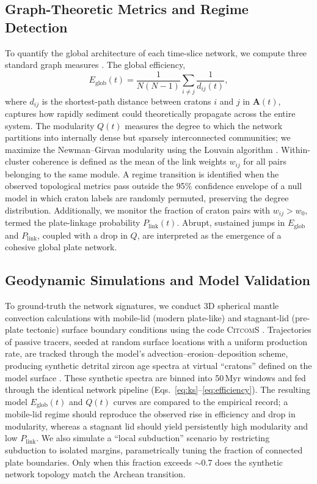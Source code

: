 \documentclass{article}
\begin{document}
\subsection{Graph-Theoretic Metrics and Regime Detection}
To quantify the global architecture of each time-slice network, we compute three standard graph measures \cite{newman2018networks}. The global efficiency,
\begin{equation}
E_{\text{glob}}(t) = \frac{1}{N(N-1)} \sum_{i \neq j} \frac{1}{d_{ij}(t)},
\label{eq:efficiency}
\end{equation}
where $d_{ij}$ is the shortest-path distance between cratons $i$ and $j$ in $\mathbf{A}(t)$, captures how rapidly sediment could theoretically propagate across the entire system. The modularity $Q(t)$ measures the degree to which the network partitions into internally dense but sparsely interconnected communities; we maximize the Newman–Girvan modularity using the Louvain algorithm \cite{blondel2008louvain}. Within-cluster coherence is defined as the mean of the link weights $w_{ij}$ for all pairs belonging to the same module. A regime transition is identified when the observed topological metrics pass outside the 95\% confidence envelope of a null model in which craton labels are randomly permuted, preserving the degree distribution. Additionally, we monitor the fraction of craton pairs with $w_{ij} > w_0$, termed the plate-linkage probability $P_{\text{link}}(t)$. Abrupt, sustained jumps in $E_{\text{glob}}$ and $P_{\text{link}}$, coupled with a drop in $Q$, are interpreted as the emergence of a cohesive global plate network.

\subsection{Geodynamic Simulations and Model Validation}
To ground-truth the network signatures, we conduct 3D spherical mantle convection calculations with mobile-lid (modern plate-like) and stagnant-lid (pre-plate tectonic) surface boundary conditions using the code \textsc{CitcomS} \cite{zhong2008supercontinent}. Trajectories of passive tracers, seeded at random surface locations with a uniform production rate, are tracked through the model’s advection–erosion–deposition scheme, producing synthetic detrital zircon age spectra at virtual “cratons” defined on the model surface \cite{korenaga2013initiation}. These synthetic spectra are binned into 50\,Myr windows and fed through the identical network pipeline (Eqs.~\ref{eq:ks}–\ref{eq:efficiency}). The resulting model $E_{\text{glob}}(t)$ and $Q(t)$ curves are compared to the empirical record; a mobile-lid regime should reproduce the observed rise in efficiency and drop in modularity, whereas a stagnant lid should yield persistently high modularity and low $P_{\text{link}}$. We also simulate a “local subduction” scenario by restricting subduction to isolated margins, parametrically tuning the fraction of connected plate boundaries. Only when this fraction exceeds $\sim$0.7 does the synthetic network topology match the Archean transition.
\end{document}
